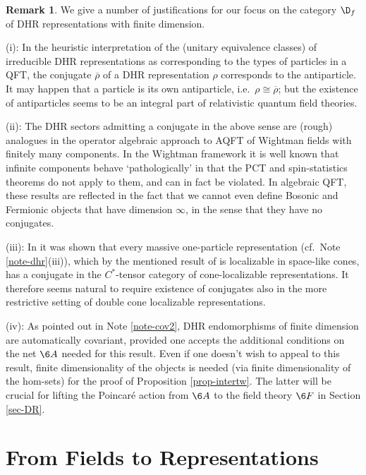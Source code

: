 \documentclass[12pt]{article}
\theoremstyle{definition}
\theoremstyle{definition}
\newtheorem{note}[thm]{Remark}
\theoremstyle{remark}
\def\ol#1{{\overline #1}}
\begin{document}
\begin{note} We give a number of justifications for our
  focus on the category $\D_f$ of DHR representations
  with finite dimension.

  (i): In the heuristic interpretation of the (unitary
  equivalence classes) of irreducible DHR
  representations as corresponding to the types of
  particles in a QFT, the conjugate $\ol{\rho}$ of a
  DHR representation $\rho$ corresponds to the
  antiparticle. It may happen that a particle is its
  own antiparticle, i.e.\ $\rho\cong\ol{\rho}$; but the
  existence of antiparticles seems to be an integral
  part of relativistic quantum field theories.

  (ii): The DHR sectors admitting a conjugate in the
  above sense are (rough) analogues in the operator
  algebraic approach to AQFT of Wightman fields with
  finitely many components. In the Wightman framework
  \cite{SW} it is well known that infinite components
  behave `pathologically' in that the PCT and
  spin-statistics theorems do not apply to them, and
  can in fact be violated. In algebraic QFT, these
  results are reflected in the fact that we cannot even
  define Bosonic and Fermionic objects that have
  dimension $\infty$, in the sense that they have no
  conjugates.

  (iii): In \cite{fred-anti} it was shown that every
  massive one-particle representation (cf.\ Note
  \ref{note-dhr}(iii)), which by the mentioned result
  of \cite{buch-fred} is localizable in space-like
  cones, has a conjugate in the $C^*$-tensor category
  of cone-localizable representations. It therefore
  seems natural to require existence of conjugates also
  in the more restrictive setting of double cone
  localizable representations.

  (iv): As pointed out in Note \ref{note-cov2}, DHR
  endomorphisms of finite dimension are automatically
  covariant, provided one accepts the additional
  conditions on the net $\6A$ needed for this result.
  Even if one doesn't wish to appeal to this result,
  finite dimensionality of the objects is needed (via
  finite dimensionality of the hom-sets) for the proof
  of Proposition \ref{prop-intertw}. The latter will be
  crucial for lifting the Poincar\'e action from $\6A$
  to the field theory $\6F$ in Section \ref{sec-DR}.
\end{note}

\section{From Fields to Representations}  \label{sec-localfield}
\end{document}
